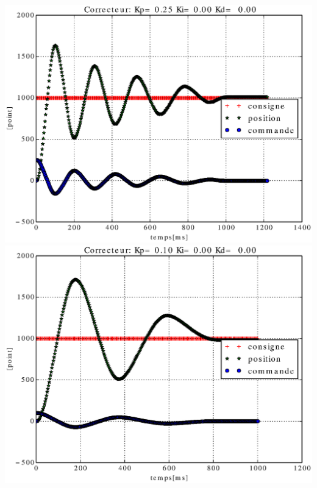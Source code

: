 \documentclass[12pt,a4paper]{article}
\begin{document}
\includegraphics[scale=0.4]{images/figure_essai_7.eps}
\includegraphics[scale=0.4]{images/figure_essai_8.eps}
\end{document}
